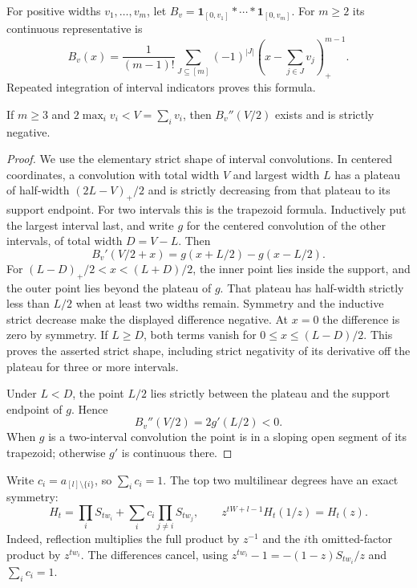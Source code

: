 For positive widths $v_1,\ldots,v_m$, let
$B_v=\mathbf1_{[0,v_1]}*\cdots*\mathbf1_{[0,v_m]}$.
For $m\ge2$ its continuous representative is
\begin{equation}\label{eq:boxspline}
 B_v(x)=\frac1{(m-1)!}
 \sum_{J\subseteq[m]}(-1)^{|J|}
       \left(x-\sum_{j\in J}v_j\right)_+^{m-1}.
\end{equation}
Repeated integration of interval indicators proves this formula.

\begin{lemma}\label{lem:boxcurvature}
If $m\ge3$ and $2\max_i v_i<V=\sum_i v_i$, then
$B_v''(V/2)$ exists and is strictly negative.
\end{lemma}
\begin{proof}
We use the elementary strict shape of interval convolutions. In
centered coordinates, a convolution with total width $V$ and largest
width $L$ has a plateau of half-width $(2L-V)_+/2$ and is strictly
decreasing from that plateau to its support endpoint. For two
intervals this is the trapezoid formula. Inductively put the largest
interval last, and write $g$ for the centered convolution of the other
intervals, of total width $D=V-L$. Then
\[
 B_v'(V/2+x)=g(x+L/2)-g(x-L/2).
\]
For $(L-D)_+/2<x<(L+D)/2$, the inner point lies inside the support,
and the outer point lies beyond the plateau of $g$. That plateau has
half-width strictly less than $L/2$ when at least two widths remain.
Symmetry and the inductive strict decrease make the displayed
difference negative. At $x=0$ the difference is zero by symmetry.
If $L\ge D$, both terms vanish for $0\le x\le(L-D)/2$.
This proves the asserted strict shape, including strict negativity
of its derivative off the plateau for three or more intervals.

Under $L<D$, the point $L/2$ lies strictly between the plateau and
the support endpoint of $g$. Hence
\[
 B_v''(V/2)=2g'(L/2)<0.
\]
When $g$ is a two-interval convolution the point is in a sloping
open segment of its trapezoid; otherwise $g'$ is continuous there.
\end{proof}

Write $c_i=a_{[l]\setminus\{i\}}$, so $\sum_i c_i=1$.
The top two multilinear degrees have an exact symmetry:
\begin{equation}\label{eq:topsymmetry}
 H_t=\prod_i S_{tw_i}+\sum_i c_i\prod_{j\ne i}S_{tw_j},
 \qquad z^{tW+l-1}H_t(1/z)=H_t(z).
\end{equation}
Indeed, reflection multiplies the full product by $z^{-1}$ and the
$i$th omitted-factor product by $z^{tw_i}$. The differences cancel,
using $z^{tw_i}-1=-(1-z)S_{tw_i}/z$ and $\sum_i c_i=1$.

